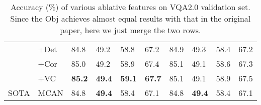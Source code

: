 \documentclass[10pt,twocolumn,letterpaper]{article}
\begin{document}
\begin{table}[]
{\begin{tabular}{p{0.8cm}lp{0.5cm}p{0.5cm}p{0.5cm}p{0.5cm}p{0.5cm}p{0.5cm}p{0.5cm}p{0.5cm}}
                         & +Det                             & 84.8   & 49.2   & 58.8  & 67.2 &84.9     &49.3    &58.4  &67.2      \\
                         & +Cor                             & 85.0     & 49.2  & 58.9  & 67.4 & 85.1    & 49.1    & 58.6 &67.3      \\
                         & \cellcolor{mygray}+VC         
& \cellcolor{mygray}\textbf{85.2}   & \cellcolor{mygray}\textbf{49.4}   & \cellcolor{mygray}\textbf{59.1}  & \cellcolor{mygray}\textbf{67.7} & \cellcolor{mygray}85.1    &\cellcolor{mygray} 49.1   &\cellcolor{mygray} 58.9  &\cellcolor{mygray} 67.5 \\ \hline
SOTA & MCAN
& 84.8   & \textbf{49.4}   & 58.4  & 67.1 & 84.8    & \textbf{49.4}   & 58.4  & 67.1 \\ \hline\hline
\end{tabular}}
\caption{Accuracy (\%) of various ablative features on VQA2.0 validation set. Since the Obj achieves almost equal results with that in the original paper, here we just merge the two rows.}
\label{tab:vqa}
\end{table}



\begin{table}[]
\centering
{}
\caption{Single model accuracies (\%) on VQA2.0 test-dev and test set, where Up-Down+VC and MCAN+VC are the short for Object-VC R-CNN feature in Up-Down and MCAN.}
\label{tab:vqa_test}
\vspace{-0.5cm}
\end{table}
\end{document}
